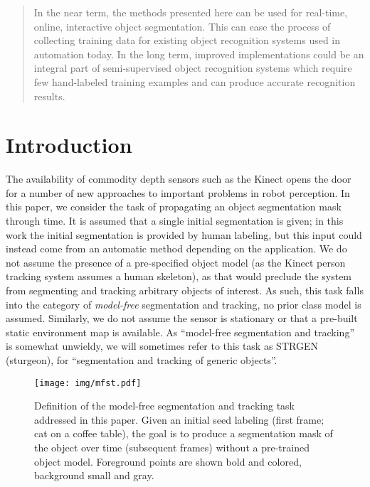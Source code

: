 \documentclass[journal]{IEEEtran}
\renewcommand{\todo}[1]{}
\begin{document}
\begin{abstract}
In the near term, the methods presented here can be used for real-time, online, interactive object segmentation.  This can ease the process of collecting training data for existing object recognition systems used in automation today. In the long term, improved implementations could be an integral part of semi-supervised object recognition systems which require few hand-labeled training examples and can produce accurate recognition results.

\end{abstract}

\section{Introduction}
\label{sec:intro}

The availability of commodity depth sensors such as the Kinect opens the door for a number of new approaches to important problems in robot perception.  In this paper, we consider the task of propagating an object segmentation mask through time. It is assumed that a single initial segmentation is given; in this work the initial segmentation is provided by human labeling, but this input could instead come from an automatic method depending on the application.  We do not assume the presence of a pre-specified object model (\eg as the Kinect person tracking system assumes a human skeleton), as that would preclude the system from segmenting and tracking arbitrary objects of interest.  As such, this task falls into the category of \emph{model-free} segmentation and tracking, \ie no prior class model is assumed.  Similarly, we do not assume the sensor is stationary or that a pre-built static environment map is available.  As ``model-free segmentation and tracking'' is somewhat unwieldy, we will sometimes refer to this task as STRGEN (sturgeon), for ``segmentation and tracking of generic objects''. \todo{Not settled on a name yet, but need something.  Happy to hear suggestions.}

\begin{figure}
  \centering
  \texttt{[image: img/mfst.pdf]}
  \caption{Definition of the model-free segmentation and tracking task addressed in this paper.  Given an initial seed labeling (first frame; cat on a coffee table), the goal is to produce a segmentation mask of the object over time (subsequent frames) without a pre-trained object model.  Foreground points are shown bold and colored, background small and gray.}
  \label{fig:goal}
\end{figure}
\end{document}
